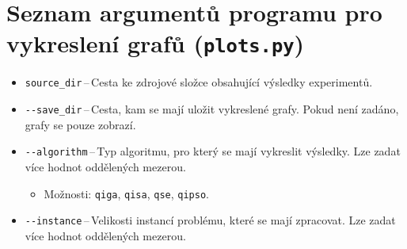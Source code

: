 \section*{Seznam argumentů programu pro vykreslení grafů (\texttt{plots.py})}
\begin{itemize}
    \item \texttt{source\_dir}\,--\,Cesta ke zdrojové složce obsahující výsledky experimentů.
    \item \texttt{-{}-save\_dir}\,--\,Cesta, kam se mají uložit vykreslené grafy. Pokud není zadáno, grafy se pouze zobrazí.
    \item \texttt{-{}-algorithm}\,--\,Typ algoritmu, pro který se mají vykreslit výsledky. Lze zadat více hodnot oddělených mezerou.
    \begin{itemize}
        \item Možnosti: \texttt{qiga}, \texttt{qisa}, \texttt{qse}, \texttt{qipso}.
    \end{itemize}
    \item \texttt{-{}-instance}\,--\,Velikosti instancí problému, které se mají zpracovat. Lze zadat více hodnot oddělených mezerou.
\end{itemize}